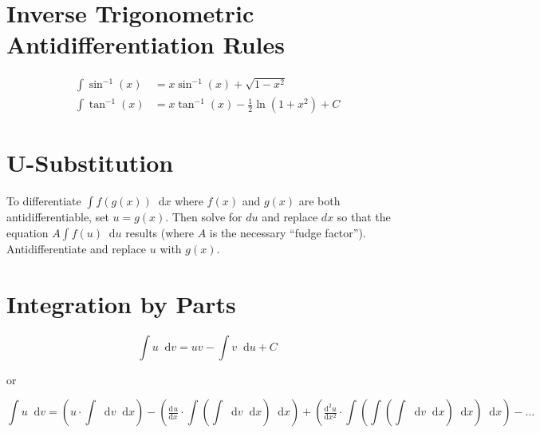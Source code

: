\documentclass[12pt]{article}
\newcommand*{\fixmath}{\makebox{}\vspace{\glueexpr-\baselineskip-\abovedisplayskip}}
\newcommand*{\asin}{\sin^{-1}}
\newcommand*{\atan}{\tan^{-1}}
\newcommand*{\dd}[3][]{\tfrac{\mathrm{d}^{#1}#2}{\mathrm{d}#3^{#1}}}
\newcommand*{\D}[1]{\mathop{}\!\mathrm{d} #1}
\newenvironment{rmaskip}{\setlength{\abovedisplayskip}{0pt}\fixmath%
  \ignorespaces}{\ignorespacesafterend}
\newenvironment{rmbskip}{\setlength{\belowdisplayskip}{0pt}\ignorespaces}%
  {\ignorespacesafterend}
\newenvironment{rmskip}{\setlength{\abovedisplayskip}{0pt}%
  \setlength{\belowdisplayskip}{0pt}\fixmath\ignorespaces}%
  {\ignorespacesafterend}
\begin{document}
\section*{Inverse Trigonometric Antidifferentiation Rules}
\begin{rmskip}
  \begin{align*}
    \int \asin(x) &= x\asin(x) + \sqrt{1-x^2}\\
    \int \atan(x) &= x\atan(x) - \frac{1}{2} \ln(1 + x^2) + C
  \end{align*}
\end{rmskip}
\section*{U-Substitution}
To differentiate \(\int f(g(x)) \D{x}\) where \(f(x)\) and \(g(x)\) are both
antidifferentiable, set \(u = g(x)\). Then solve for \(du\) and replace \(dx\)
so that the equation \(A\int f(u) \D{u}\) results (where \(A\) is the necessary
``fudge factor''). Antidifferentiate and replace \(u\) with \(g(x)\).
\section*{Integration by Parts}
\begin{rmaskip}
  \[
    \int u \D{v} = uv - \int v \D{u} + C
  \]
\end{rmaskip}

or

\begin{rmbskip}
  \[
    \int u \D{v} = \left(u \cdot \int \D{v} \D{x}\right) - \left(
      \dd{u}{x} \cdot \int \left( \int \D{v} \D{x} \right) \D{x}
      \right) + \left(\dd[2]{u}{x} \cdot \int \left( \int \left( \int \D{v}
      \D{x} \right) \D{x} \right) \D{x} \right) - \dots
  \]
\end{rmbskip}
\end{document}
